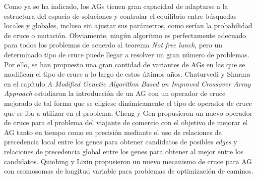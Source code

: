 Como ya se ha indicado, los AGs tienen gran capacidad de adaptarse a la estructura del espacio de soluciones y controlar el equilibrio entre búsquedas locales y globales, incluso sin ajustar sus parámetros, como serían la probabilidad de cruce o mutación. 
Obviamente, ningún algoritmo es perfectamente adecuado para todos los problemas de acuerdo al teorema \textit{Not free lunch}, pero un determinado tipo de cruce puede llegar a resolver un gran número de problemas. 
Por ello, se han propuesto una gran cantidad de variantes de AGs en las que se modifican el tipo de cruce a lo largo de estos últimos años. 
Chaturvedi y Sharma en el capítulo \textit{A Modified Genetic Algorithm Based on Improved Crossover Array Approach} \parencite{chaturvediModifiedGeneticAlgorithm2019} estudiaron la introducción de un AG con un operador de cruce mejorado de tal forma que se eligiese dinámicamente el tipo de operador de cruce que se iba a utilizar en el problema. 
Cheng y Gen \parencite{chengCrossoverIntensiveSearch1994} propusieron un nuevo operador de cruce para el problema del viajante de comercio con el objetivo de mejorar el AG tanto en tiempo como en precisión mediante el uso de relaciones de precedencia local entre los genes para obtener candidatos de posibles \textit{edges} y relaciones de precedencia global entre los genes para obtener al mejor entre los candidatos. 
Quiobing y Lixin \parencite{qiongbingNewCrossoverMechanism2016} propusieron un nuevo mecanismo de cruce para AG con cromosomas de longitud variable para problemas de optimización de caminos.

